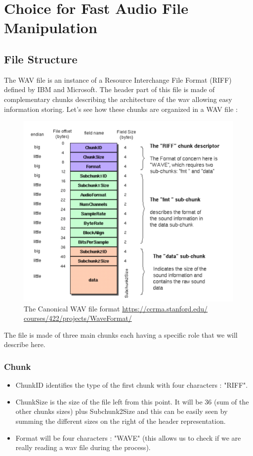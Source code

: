 \documentclass[a4paper]{report}
\begin{document}
\chapter{Choice for Fast Audio File Manipulation}

\section{File Structure}
The WAV file is an instance of a Resource Interchange File Format (RIFF) defined by IBM and Microsoft. The header part of this file is made of complementary chunks describing the architecture of the wav allowing easy information storing.
Let's see how these chunks are organized in a WAV file :

\begin{figure}[H]
\begin{center}
\includegraphics[scale=0.31]{wavformat.png}\caption{The Canonical WAV file format \url{https://ccrma.stanford.edu/
courses/422/projects/WaveFormat/}}
\end{center}
\end{figure}

The file is made of three main chunks each having a specific role that we will describe here.
\subsection*{Chunk}
\begin{itemize}

\item ChunkID identifies the type of the first chunk with four characters : "RIFF".
\item ChunkSize is the size of the file left from this point. It will be 36 (sum of the other chunks sizes) plus Subchunk2Size and this can be easily seen by summing the different sizes on the right of the header representation.
\item Format will be four characters : "WAVE" (this allows us to check if we are really reading a wav file during the process).
\end{itemize}
\end{document}
